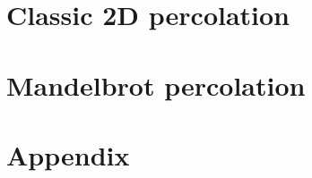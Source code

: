 


\cleardoublepage %


\pagestyle{scrheadings} %

\cleardoublepage %

\cleardoublepage


\cleardoublepage %



\part{Classic 2D percolation} %

 
\afterpage{\blankpage}
 
\afterpage{\blankpage}
\part{Mandelbrot percolation}
 





\afterpage{\blankpage} %
\clearpage
\part{Appendix}
\appendix
 


\cleardoublepage %



